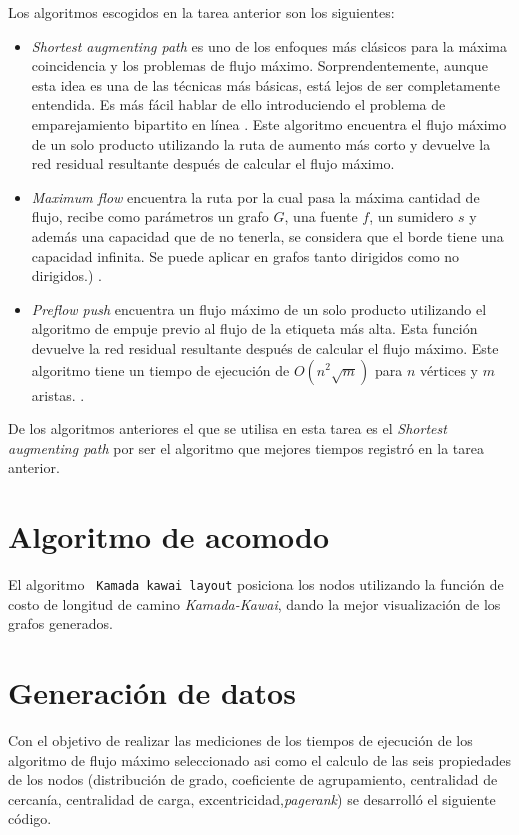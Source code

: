 \documentclass{article}
\begin{document}
Los algoritmos escogidos en la tarea anterior son los siguientes:
\begin{itemize}
  \item\textit{Shortest augmenting path} es uno de los enfoques más clásicos para la máxima coincidencia y los problemas de flujo máximo. Sorprendentemente, aunque esta idea es una de las técnicas más básicas, está lejos de ser completamente entendida. Es más fácil hablar de ello introduciendo el problema de emparejamiento bipartito en línea \cite{Bosek2018}. Este algoritmo encuentra el flujo máximo de un solo producto utilizando la ruta de aumento más corto y devuelve la red residual resultante después de calcular el flujo máximo.   
   \item\textit{Maximum flow} encuentra la ruta por la cual pasa la máxima cantidad de flujo, recibe como parámetros un grafo $G$, una fuente $f$, un sumidero $s$ y además una capacidad que de no tenerla, se considera que el borde tiene una capacidad infinita. Se puede aplicar en grafos tanto dirigidos como no dirigidos.) \cite{mf}.
	\item\textit{Preflow push} encuentra un flujo máximo de un solo producto utilizando el algoritmo de empuje previo al flujo de la etiqueta más alta. Esta función devuelve la red residual resultante después de calcular el flujo máximo. Este algoritmo tiene un tiempo de ejecución de $ O(n^{2}\sqrt{m})$ para $n$ vértices y $m$ aristas. \cite{gc}.
\end{itemize}

De los algoritmos anteriores el que se utilisa en esta tarea es el \textit{Shortest augmenting path} por ser el algoritmo que mejores tiempos registró en la tarea anterior.
\section{Algoritmo de acomodo}

El algoritmo \texttt{ Kamada kawai layout} posiciona los nodos utilizando la función de costo de longitud de camino \textit{Kamada-Kawai}, dando la mejor visualización de los grafos generados.

\section{Generación de datos}
Con el objetivo de realizar las mediciones de los tiempos de ejecución de los algoritmo de flujo máximo seleccionado asi como el calculo de las seis propiedades de los nodos (distribución de grado, coeficiente de agrupamiento, centralidad de cercanía, centralidad de carga, excentricidad,\textit{pagerank}) se desarrolló el siguiente código.
\end{document}

